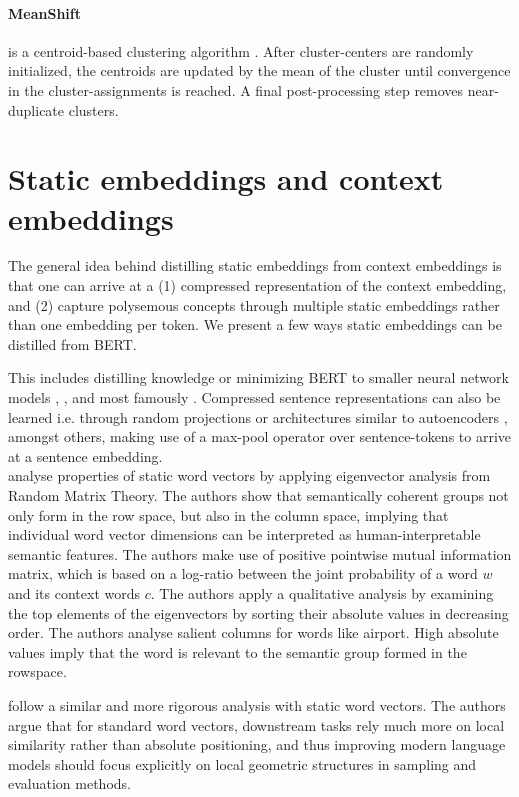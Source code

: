 \documentclass[a4paper,12pt,twoside,openright]{report}
\begin{document}
\paragraph{MeanShift} is a centroid-based clustering algorithm \cite{comaniciu02}.
After cluster-centers are randomly initialized, the centroids are updated by the mean of the cluster until convergence in the cluster-assignments is reached.
A final post-processing step removes near-duplicate clusters.


\section{Static embeddings and context embeddings}

The general idea behind distilling static embeddings from context embeddings is that one can arrive at a (1) compressed representation of the context embedding, and (2) capture polysemous concepts through multiple static embeddings rather than one embedding per token. 
We present a few ways static embeddings can be distilled from BERT.

This includes  distilling knowledge or minimizing BERT to smaller neural network models \cite{tang19}, \cite{tsai19}, and most famously \cite{sanh19}.
Compressed sentence representations can also be learned i.e. through random projections or architectures similar to autoencoders \cite{shen19}, amongst others, making use of a max-pool operator over sentence-tokens to arrive at a sentence embedding. \\

\cite{shin18} analyse properties of static word vectors by applying eigenvector analysis from Random Matrix Theory.
The authors show that semantically coherent groups not only form in the row space, but also in the column space, implying that individual word vector dimensions can be interpreted as human-interpretable semantic features.
The authors make use of positive pointwise mutual information matrix, which is based on a log-ratio between the joint probability of a word $w$ and its context words $c$.
The authors apply a qualitative analysis by examining the top elements of the eigenvectors by sorting their absolute values in decreasing order.
The authors analyse salient columns for words like airport.
High absolute values imply that the word is relevant to the semantic group formed in the rowspace.

\cite{whitaker19} follow a similar and more rigorous analysis with static word vectors. 
The authors argue that for standard word vectors, downstream tasks rely much more on local similarity rather than absolute positioning, and thus improving modern language models should focus explicitly on local geometric structures in sampling and evaluation methods.
\end{document}
